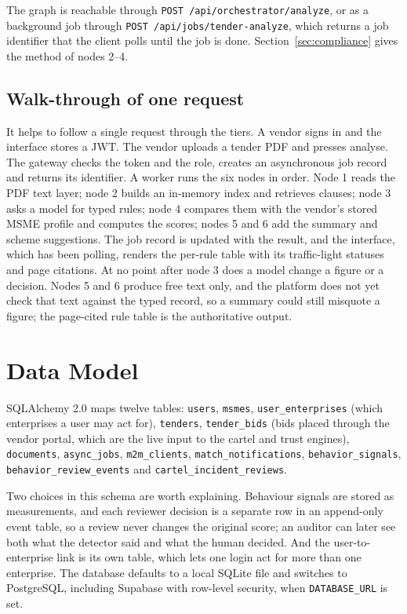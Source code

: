 The graph is reachable through \texttt{POST /api/orchestrator/analyze}, or as a background job through \texttt{POST /api/jobs/tender-analyze}, which returns a job identifier that the client polls until the job is done. Section~\ref{sec:compliance} gives the method of nodes 2--4.

\subsection{Walk-through of one request}
It helps to follow a single request through the tiers. A vendor signs in and the interface stores a JWT. The vendor uploads a tender PDF and presses analyse. The gateway checks the token and the role, creates an asynchronous job record and returns its identifier. A worker runs the six nodes in order. Node 1 reads the PDF text layer; node 2 builds an in-memory index and retrieves clauses; node 3 asks a model for typed rules; node 4 compares them with the vendor's stored MSME profile and computes the scores; nodes 5 and 6 add the summary and scheme suggestions. The job record is updated with the result, and the interface, which has been polling, renders the per-rule table with its traffic-light statuses and page citations. At no point after node 3 does a model change a figure or a decision. Nodes 5 and 6 produce free text only, and the platform does not yet check that text against the typed record, so a summary could still misquote a figure; the page-cited rule table is the authoritative output.

\section{Data Model}
SQLAlchemy 2.0 maps twelve tables: \texttt{users}, \texttt{msmes}, \texttt{user\_enterprises} (which enterprises a user may act for), \texttt{tenders}, \texttt{tender\_bids} (bids placed through the vendor portal, which are the live input to the cartel and trust engines), \texttt{documents}, \texttt{async\_jobs}, \texttt{m2m\_clients}, \texttt{match\_notifications}, \texttt{behavior\_signals}, \texttt{behavior\_review\_events} and \texttt{cartel\_incident\_reviews}.

Two choices in this schema are worth explaining. Behaviour signals are stored as measurements, and each reviewer decision is a separate row in an append-only event table, so a review never changes the original score; an auditor can later see both what the detector said and what the human decided. And the user-to-enterprise link is its own table, which lets one login act for more than one enterprise. The database defaults to a local SQLite file and switches to PostgreSQL, including Supabase with row-level security, when \texttt{DATABASE\_URL} is set.

